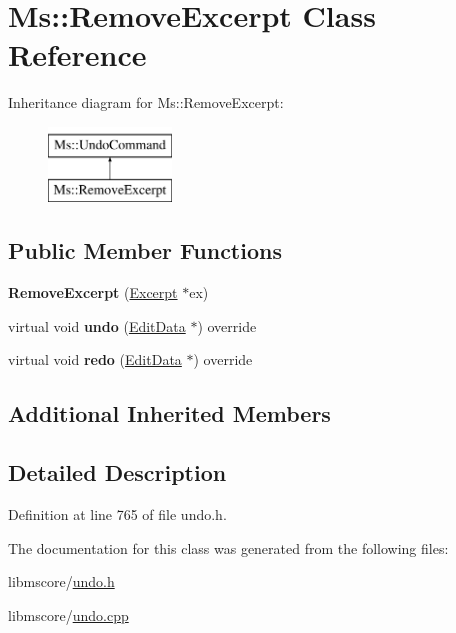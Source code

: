 \hypertarget{class_ms_1_1_remove_excerpt}{}\section{Ms\+:\+:Remove\+Excerpt Class Reference}
\label{class_ms_1_1_remove_excerpt}
Inheritance diagram for Ms\+:\+:Remove\+Excerpt\+:\begin{figure}[H]
\begin{center}
\leavevmode
\includegraphics[height=2.000000cm]{class_ms_1_1_remove_excerpt}
\end{center}
\end{figure}
\subsection*{Public Member Functions}
\begin{DoxyCompactItemize}
\item 
\mbox{\label{class_ms_1_1_remove_excerpt_a0b76bb784c2575bfba1f4efecfea5d49}} 
{\bfseries Remove\+Excerpt} (\hyperlink{class_ms_1_1_excerpt}{Excerpt} $\ast$ex)
\item 
\mbox{\label{class_ms_1_1_remove_excerpt_ae8a4dee431cd3a55f10b850b36b90333}} 
virtual void {\bfseries undo} (\hyperlink{class_ms_1_1_edit_data}{Edit\+Data} $\ast$) override
\item 
\mbox{\label{class_ms_1_1_remove_excerpt_ae2cebaf542796930849e880bf7457f18}} 
virtual void {\bfseries redo} (\hyperlink{class_ms_1_1_edit_data}{Edit\+Data} $\ast$) override
\end{DoxyCompactItemize}
\subsection*{Additional Inherited Members}


\subsection{Detailed Description}


Definition at line 765 of file undo.\+h.



The documentation for this class was generated from the following files\+:\begin{DoxyCompactItemize}
\item 
libmscore/\hyperlink{undo_8h}{undo.\+h}\item 
libmscore/\hyperlink{undo_8cpp}{undo.\+cpp}\end{DoxyCompactItemize}
